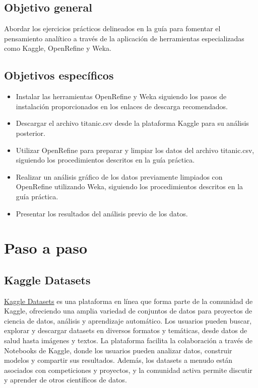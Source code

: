 \documentclass[12pt]{article}
\begin{document}
        \subsection{Objetivo general}
            Abordar los ejercicios prácticos delineados en la guía para fomentar el pensamiento analítico a través de la aplicación de herramientas especializadas como Kaggle, OpenRefine y Weka.

        \subsection{Objetivos específicos}
            \begin{itemize}
                \item Instalar las herramientas OpenRefine y Weka siguiendo los pasos de instalación proporcionados en los enlaces de descarga recomendados.
                \item Descargar el archivo titanic.csv desde la plataforma Kaggle para su análisis posterior.
                \item Utilizar OpenRefine para preparar y limpiar los datos del archivo titanic.csv, siguiendo los procedimientos descritos en la guía práctica.
                \item Realizar un análisis gráfico de los datos previamente limpiados con OpenRefine utilizando Weka, siguiendo los procedimientos descritos en la guía práctica.
                \item Presentar los resultados del análisis previo de los datos.
            \end{itemize}

    \section{Paso a paso}
            \subsection{Kaggle Datasets}
                \href{https://www.kaggle.com/datasets}{\uline{Kaggle Datasets}} es una plataforma en línea que forma parte de la comunidad de Kaggle, ofreciendo una amplia variedad de conjuntos de datos para proyectos de ciencia de datos, análisis y aprendizaje automático. Los usuarios pueden buscar, explorar y descargar datasets en diversos formatos y temáticas, desde datos de salud hasta imágenes y textos. La plataforma facilita la colaboración a través de Notebooks de Kaggle, donde los usuarios pueden analizar datos, construir modelos y compartir sus resultados. Además, los datasets a menudo están asociados con competiciones y proyectos, y la comunidad activa permite discutir y aprender de otros científicos de datos.
\end{document}
